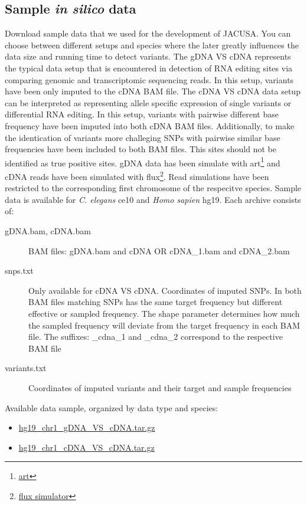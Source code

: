 \documentclass[12pt, a4paper]{article}
\begin{document}
\subsection{Sample \textit{in silico} data}
Download sample data that we used for the development of JACUSA. You can choose between different
setups and species where the later greatly influences the data size and running time to detect
variants. The gDNA VS cDNA represents the typical data setup that is encountered in detection of RNA
editing sites via comparing genomic and transcriptomic sequencing reads. In this setup, variants
have been only imputed to the cDNA BAM file. The cDNA VS cDNA data setup can be interpreted as
representing allele specific expression of single variants or differential RNA editing. In this
setup, variants with pairwise different base frequency have been imputed into both cDNA BAM files.
Additionally, to make the identication of variants more challeging SNPs with pairwise similar base
frequencies have been included to both BAM files. This sites should not be identified as true
positive sites.
gDNA data has been simulate with
art\footnote{\href{http://www.niehs.nih.gov/research/resources/software/biostatistics/art/}{art}}
and cDNA reads have been simulated with
flux\footnote{\href{http://sammeth.net/confluence/display/SIM/Home}{flux simulator}}. Read
simulations have been restricted to the corresponding first chromosome of the respecitve species.
Sample data is available for \textit{C. elegans} ce10 and \textit{Homo sapien} hg19. Each archive
consists of:
\begin{description}
  \item[gDNA.bam, cDNA.bam] BAM files: gDNA.bam and cDNA OR cDNA\_1.bam and cDNA\_2.bam
  \item[snps.txt] Only available for cDNA VS cDNA. Coordinates of imputed SNPs. In both
  BAM files matching SNPs has the same target frequency but different effective or sampled
  frequency. The shape parameter determines how much the sampled frequency will deviate from the
  target frequency in each BAM file. The suffixes: \_cdna\_1 and \_cdna\_2 correspond to the
  respective BAM file
  \item[variants.txt] Coordinates of imputed variants and their target and sample
  frequencies
\end{description}
Available data sample, organized by data type and species:
\begin{itemize}
  \item
  \href{http://www.age.mpg.com/software/jacusa/sample_data/hg19_chr1_gDNA_VS_cDNA.tar.gz}{hg19\_chr1\_gDNA\_VS\_cDNA.tar.gz}
  \item
  \href{http://www.age.mpg.com/software/jacusa/sample_data/hg19_chr1_cDNA_VS_cDNA.tar.gz}{hg19\_chr1\_cDNA\_VS\_cDNA.tar.gz}
\end{itemize}
\end{document}
